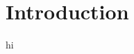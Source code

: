 \chapter{Introduction}\label{chapter:Introduction}

\renewcommand{\thepage}{\arabic{page}}
hi
\setcounter{page}{1}
